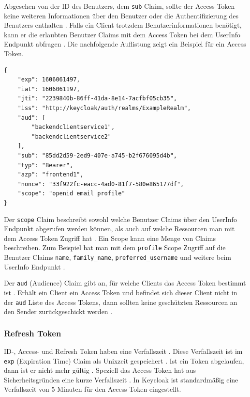 Abgesehen von der ID des Benutzers, dem \texttt{sub} Claim, sollte der Access Token keine weiteren Informationen über den Benutzer oder die Authentifizierung des Benutzers enthalten \cite{EB7}. Falls ein Client trotzdem Benutzerinformationen benötigt, kann er die erlaubten Benutzer Claims mit dem Access Token bei dem UserInfo Endpunkt abfragen \cite[UserInfo Endpoint]{EB4}. Die nachfolgende Auflistung zeigt ein Beispiel für ein Access Token.

\begin{lstlisting}[caption=Beispiel Access Token, captionpos=b]
{
	"exp": 1606061497,
	"iat": 1606061197,
	"jti": "2239840b-86ff-41da-8e14-7acfbf05cb35",
	"iss": "http://keycloak/auth/realms/ExampleRealm",
	"aud": [
		"backendclientservice1",
		"backendclientservice2"
	],
	"sub": "85dd2d59-2ed9-407e-a745-b2f676095d4b",
	"typ": "Bearer",
	"azp": "frontend1",
	"nonce": "33f922fc-eacc-4ad0-81f7-580e865177df",
	"scope": "openid email profile"
}
\end{lstlisting}

Der \texttt{scope} Claim beschreibt sowohl welche Benutzer Claims über den UserInfo Endpunkt abgerufen werden können, als auch auf welche Ressourcen man mit dem Access Token Zugriff hat \cite[Requesting Claims]{EB4} \cite{EB7}. Ein Scope kann eine Menge von Claims beschreiben. Zum Beispiel hat man mit dem \texttt{profile} Scope Zugriff auf die Benutzer Claims \texttt{name}, \texttt{family\_name}, \texttt{preferred\_username} und weitere beim UserInfo Endpunkt \cite[Requesting Claims]{EB4}. 

Der \texttt{aud} (Audience) Claim gibt an, für welche Clients das Access Token bestimmt ist \cite[ID Token]{EB4}. Erhält ein Client ein Access Token und befindet sich dieser Client nicht in der \texttt{aud} Liste des Access Tokens, dann sollten keine geschützten Ressourcen an den Sender zurückgeschickt werden \cite{EB59}.

\subsubsection{Refresh Token}

ID-, Access- und Refresh Token haben eine Verfallszeit \cite[Sec. 4.1.4]{SSEB_RFC7519} \cite[ID Token]{EB4}. Diese Verfallszeit ist im \texttt{exp} (Expiration Time) Claim als Unixzeit gespeichert \cite[Sec. 4.1.4]{SSEB_RFC7519}. Ist ein Token abgelaufen, dann ist er nicht mehr gültig \cite[Sec. 4.1.4]{SSEB_RFC7519}. Speziell das Access Token hat aus Sicherheitsgründen eine kurze Verfallszeit \cite{EB61}. In Keycloak ist standardmäßig eine Verfallszeit von 5 Minuten für den Access Token eingestellt.

